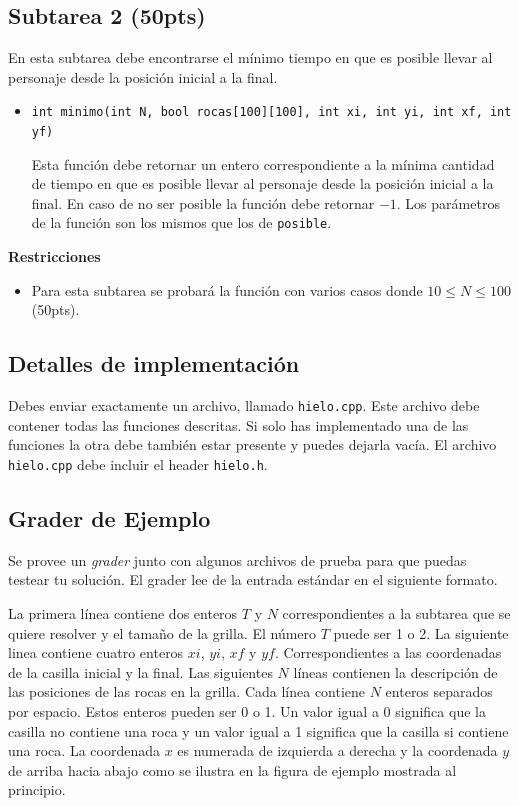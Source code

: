 \documentclass{oci}
\begin{document}
\subsection*{Subtarea 2 (50pts)}
En esta subtarea debe encontrarse el mínimo tiempo en que es posible llevar al personaje desde la posición inicial a la final.

\begin{itemize}
	\item \verb+int minimo(int N, bool rocas[100][100], int xi, int yi, int xf, int yf)+

	Esta función debe retornar un entero correspondiente a la mínima cantidad de tiempo en que es posible llevar al personaje desde la posición inicial a la final.
  En caso de no ser posible la función debe retornar $-1$.
  Los parámetros de la función son los mismos que los de \verb+posible+.
\end{itemize}
\vspace{-0.55em}
{\bf Restricciones}
\vspace{-1em}
\begin{itemize}
\item Para esta subtarea se probará la función con varios casos donde $10 \leq N\leq 100$ (50pts).
\end{itemize}

\subsection*{Detalles de implementación}
Debes enviar exactamente un archivo, llamado \verb+hielo.cpp+.
Este archivo debe contener todas las funciones descritas.
Si solo has implementado una de las funciones la otra debe también estar presente y puedes dejarla vacía.
El archivo \verb+hielo.cpp+ debe incluir el header \verb+hielo.h+.

\subsection*{Grader de Ejemplo}
Se provee un \emph{grader} junto con algunos archivos de prueba para que puedas testear tu solución.
El grader lee de la entrada estándar en el siguiente formato.

La primera línea contiene dos enteros $T$ y $N$ correspondientes a la subtarea que se quiere resolver y el tamaño de la grilla.
El número $T$ puede ser 1 o 2.
La siguiente linea contiene cuatro enteros $xi$, $yi$, $xf$ y $yf$.
Correspondientes a las coordenadas de la casilla inicial y la final.
Las siguientes $N$ líneas contienen la descripción de las posiciones de las rocas en la grilla.
Cada línea contiene $N$ enteros separados por espacio.
Estos enteros pueden ser 0 o 1.
Un valor igual a 0 significa que la casilla no contiene una roca y un valor igual a 1 significa que la casilla si contiene una roca.
La coordenada $x$ es numerada de izquierda a derecha y la coordenada $y$ de arriba hacia abajo como se ilustra en la figura de ejemplo mostrada al principio.
\end{document}
